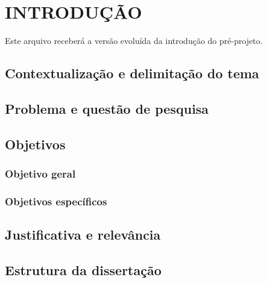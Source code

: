 \chapter{INTRODUÇÃO}

Este arquivo receberá a versão evoluída da introdução do pré-projeto.

\section{Contextualização e delimitação do tema}

\section{Problema e questão de pesquisa}

\section{Objetivos}

\subsection{Objetivo geral}

\subsection{Objetivos específicos}

\section{Justificativa e relevância}

\section{Estrutura da dissertação}
